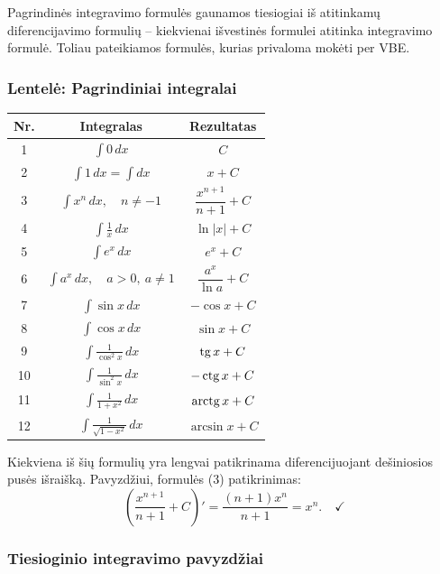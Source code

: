 Pagrindinės integravimo formulės gaunamos tiesiogiai iš atitinkamų diferencijavimo formulių – kiekvienai išvestinės formulei atitinka integravimo formulė. Toliau pateikiamos formulės, kurias privaloma mokėti per VBE.

\subsubsection*{Lentelė: Pagrindiniai integralai}

\begin{center}
\renewcommand{\arraystretch}{2.0}
\begin{tabular}{|c|c|c|}
\hline
\textbf{Nr.} & \textbf{Integralas} & \textbf{Rezultatas} \\
\hline
1 & $\displaystyle\int 0\,dx$ & $C$ \\
\hline
2 & $\displaystyle\int 1\,dx = \int dx$ & $x + C$ \\
\hline
3 & $\displaystyle\int x^n\,dx,\quad n \neq -1$ & $\dfrac{x^{n+1}}{n+1} + C$ \\
\hline
4 & $\displaystyle\int \frac{1}{x}\,dx$ & $\ln|x| + C$ \\
\hline
5 & $\displaystyle\int e^x\,dx$ & $e^x + C$ \\
\hline
6 & $\displaystyle\int a^x\,dx,\quad a>0,\ a\neq 1$ & $\dfrac{a^x}{\ln a} + C$ \\
\hline
7 & $\displaystyle\int \sin x\,dx$ & $-\cos x + C$ \\
\hline
8 & $\displaystyle\int \cos x\,dx$ & $\sin x + C$ \\
\hline
9 & $\displaystyle\int \frac{1}{\cos^2 x}\,dx$ & $\operatorname{tg} x + C$ \\
\hline
10 & $\displaystyle\int \frac{1}{\sin^2 x}\,dx$ & $-\operatorname{ctg} x + C$ \\
\hline
11 & $\displaystyle\int \frac{1}{1+x^2}\,dx$ & $\operatorname{arctg} x + C$ \\
\hline
12 & $\displaystyle\int \frac{1}{\sqrt{1-x^2}}\,dx$ & $\arcsin x + C$ \\
\hline
\end{tabular}
\end{center}

Kiekviena iš šių formulių yra lengvai patikrinama diferencijuojant dešiniosios pusės išraišką. Pavyzdžiui, formulės (3) patikrinimas:
\[
\left(\frac{x^{n+1}}{n+1}+C\right)' = \frac{(n+1)x^n}{n+1} = x^n. \quad \checkmark
\]

\subsubsection*{Tiesioginio integravimo pavyzdžiai}

